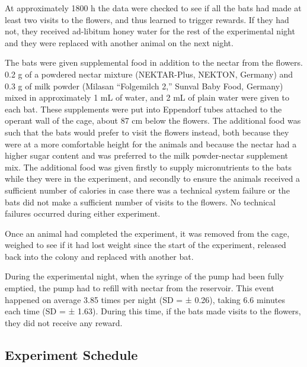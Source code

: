 \documentclass[
]{article}
\begin{document}
At approximately 1800 h the data were checked to see if all the bats had made at least two visits to the flowers, and thus learned to trigger rewards. If they had not, they received ad-libitum honey water for the rest of the experimental night and they were replaced with another animal on the next night.

The bats were given supplemental food in addition to the nectar from the flowers. 0.2 g of a powdered nectar mixture (NEKTAR-Plus, NEKTON, Germany) and 0.3 g of milk powder (Milasan ``Folgemilch 2,'' Sunval Baby Food, Germany) mixed in approximately 1 mL of water, and 2 mL of plain water were given to each bat. These supplements were put into Eppendorf tubes attached to the operant wall of the cage, about 87 cm below the flowers. The additional food was such that the bats would prefer to visit the flowers instead, both because they were at a more comfortable height for the animals and because the nectar had a higher sugar content and was preferred to the milk powder-nectar supplement mix. The additional food was given firstly to supply micronutrients to the bats while they were in the experiment, and secondly to ensure the animals received a sufficient number of calories in case there was a technical system failure or the bats did not make a sufficient number of visits to the flowers. No technical failures occurred during either experiment.

Once an animal had completed the experiment, it was removed from the cage, weighed to see if it had lost weight since the start of the experiment, released back into the colony and replaced with another bat.

During the experimental night, when the syringe of the pump had been fully emptied, the pump had to refill with nectar from the reservoir. This event happened on average 3.85 times per night (SD = ± 0.26), taking 6.6 minutes each time (SD = ± 1.63). During this time, if the bats made visits to the flowers, they did not receive any reward.

\hypertarget{experiment-schedule}{%
\subsection{Experiment Schedule}\label{experiment-schedule}}
\end{document}
